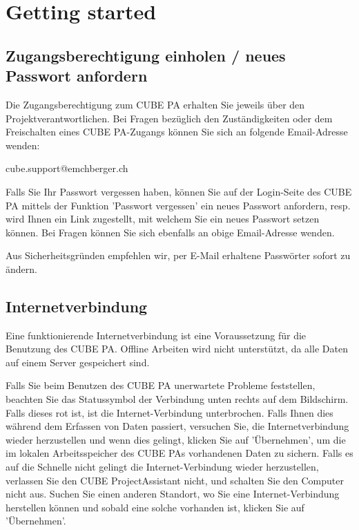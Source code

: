 

\section{Getting started}
\subsection{Zugangsberechtigung einholen / neues Passwort anfordern}


Die Zugangsberechtigung zum CUBE PA erhalten Sie jeweils über den Projektverantwortlichen. Bei Fragen bezüglich den Zuständigkeiten oder dem Freischalten eines CUBE PA-Zugangs können Sie sich an folgende Email-Adresse wenden:

\vspace{\baselineskip}

{\color{red} cube.support@emchberger.ch}

\vspace{\baselineskip}

Falls Sie Ihr Passwort vergessen haben, können Sie auf der Login-Seite des CUBE PA mittels der Funktion 'Passwort vergessen' ein neues Passwort anfordern, resp. wird Ihnen ein Link zugestellt, mit welchem Sie ein neues Passwort setzen können. Bei Fragen können Sie sich ebenfalls an obige Email-Adresse wenden.

\vspace{\baselineskip}

Aus Sicherheitsgründen empfehlen wir, per E-Mail erhaltene Passwörter sofort zu ändern.

\subsection{Internetverbindung}

Eine funktionierende Internetverbindung ist eine Voraussetzung für die Benutzung des CUBE PA. Offline Arbeiten wird nicht unterstützt, da alle Daten auf einem Server gespeichert sind.

\vspace{\baselineskip}

Falls Sie beim Benutzen des CUBE PA unerwartete Probleme feststellen, beachten Sie das Statussymbol der Verbindung unten rechts auf dem Bildschirm. Falls dieses rot ist, ist die Internet-Verbindung unterbrochen. Falls Ihnen dies während dem Erfassen von Daten passiert, versuchen Sie, die Internetverbindung wieder herzustellen und wenn dies gelingt, klicken Sie auf 'Übernehmen', um die im lokalen Arbeitsspeicher des CUBE PAs vorhandenen Daten zu sichern. Falls es auf die Schnelle nicht gelingt die Internet-Verbindung wieder herzustellen, verlassen Sie den CUBE ProjectAssistant nicht, und schalten Sie den Computer nicht aus. Suchen Sie einen anderen Standort, wo Sie eine Internet-Verbindung herstellen
können und sobald eine solche vorhanden ist, klicken Sie auf 'Übernehmen'.

